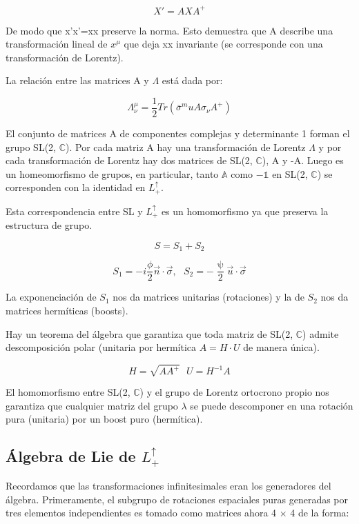 \documentclass{article}
\begin{document}
\begin{itemize}
$$X'=AXA^+$$

De modo que x'x'=xx preserve la norma. Esto demuestra que A describe una transformación lineal de $x^\mu$ que deja xx invariante (se corresponde con una transformación de Lorentz).

\newpage
La relación entre las matrices A y $\Lambda$ está dada por:

$$\Lambda _\nu ^\mu =\frac{1}{2}Tr(\bar{\sigma}^mu A \sigma _\nu A^+)$$

El conjunto de matrices A de componentes complejas y determinante 1 forman el grupo SL(2, $\mathds{C}$). Por cada matriz A hay una transformación de Lorentz $\Lambda$ y por cada transformación de Lorentz hay dos matrices de SL(2, $\mathds{C}$), A y -A. Luego es un homeomorfismo de grupos, en particular, tanto $\mathds{A}$ como $-\mathds{1}$ en SL(2, $\mathds{C}$) se corresponden con la identidad en $L_+^\uparrow$.

Esta correspondencia entre SL y $L_+^\uparrow$ es un homomorfismo ya que preserva la estructura de grupo.

$$S=S_1+S_2$$

$$S_1=-i\frac{\phi}{2}\Vec{n}\cdot \Vec{\sigma}, \ \ \ S_2=-\frac{\uppsi}{2}\Vec{u}\cdot \Vec{\sigma}$$

La exponenciación de $S_1$ nos da matrices unitarias (rotaciones) y la de $S_2$ nos da matrices hermíticas (boosts).

\smallskip
Hay un teorema del álgebra que garantiza que toda matriz de SL(2, $\mathds{C}$) admite descomposición polar (unitaria por hermítica $A=H\cdot U$ de manera única).

$$H=\sqrt{AA^+} \ \ \ U=H^{-1}A$$

El homomorfismo entre SL(2, $\mathds{C}$) y el grupo de Lorentz ortocrono propio nos garantiza que cualquier matriz del grupo $\lambda$ se puede descomponer en una rotación pura (unitaria) por un boost puro (hermítica).

\end{itemize}

\subsection{Álgebra de Lie de $L^\uparrow_+$}

Recordamos que las transformaciones infinitesimales eran los generadores del álgebra. Primeramente, el subgrupo de rotaciones espaciales puras generadas por tres elementos independientes es tomado como matrices ahora 4 $\times$ 4 de la forma:
\end{document}
